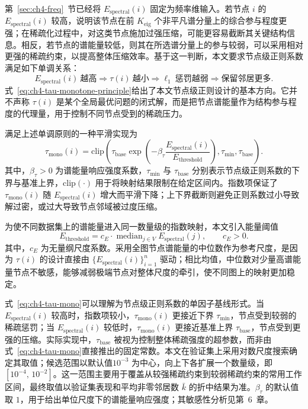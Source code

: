 第~\ref{sec:ch4-freq}~节已经将 \(E_{\text{spectral}}(i)\) 固定为频率维输入。若节点 \(i\) 的 \(E_{\text{spectral}}(i)\) 较高，说明该节点在前 \(K_{\text{eig}}\) 个非平凡谱分量上的综合参与程度更强；在稀疏化过程中，对这类节点施加过强压缩，可能更容易截断其关键结构信息。相反，若节点的谱能量较低，则其在所选谱分量上的参与较弱，可以采用相对更强的稀疏约束，以提高整体压缩效率。基于这一判断，本文要求节点级正则系数满足如下单调关系：
\begin{equation}
  E_{\text{spectral}}(i)\ \text{越高}
  \Rightarrow
  \tau(i)\ \text{越小}
  \Rightarrow
  \ell_1\ \text{惩罚越弱}
  \Rightarrow
  \text{保留邻居更多}.
  \label{eq:ch4-tau-monotone-principle}
\end{equation}
式~\eqref{eq:ch4-tau-monotone-principle}给出了本文节点级正则设计的基本方向。它并不声称 \(\tau(i)\) 是某个全局最优问题的闭式解，而是把节点谱能量作为结构参与程度的代理量，用于控制不同节点受到的稀疏压力。

满足上述单调原则的一种平滑实现为
\begin{equation}
  \tau_{\text{mono}}(i)=\mathrm{clip}\!\left(
  \tau_{\text{base}}
  \exp\!\left(
  -\beta_{\tau}\frac{E_{\text{spectral}}(i)}{E_{\text{threshold}}}
  \right),
  \tau_{\min},\tau_{\text{base}}
  \right).
  \label{eq:ch4-tau-mono}
\end{equation}
其中，\(\beta_{\tau}>0\) 为谱能量响应强度系数，\(\tau_{\min}\) 与 \(\tau_{\text{base}}\) 分别表示节点级正则系数的下界与基准上界，\(\mathrm{clip}(\cdot)\) 用于将映射结果限制在给定区间内。指数项保证了 \(\tau_{\text{mono}}(i)\) 随 \(E_{\text{spectral}}(i)\) 增大而平滑下降；上下界截断则避免正则系数过小导致解过密，或过大导致节点邻域被过度压缩。

为使不同数据集上的谱能量进入同一数量级的指数映射，本文引入能量阈值
\begin{equation}
  E_{\text{threshold}}
  =
  c_E \cdot \operatorname{median}_{j\in V} E_{\text{spectral}}(j),
  \qquad c_E>0.
  \label{eq:ch4-ethreshold}
\end{equation}
其中，\(c_E\) 为无量纲尺度系数。采用全图节点谱能量的中位数作为参考尺度，是因为 \(\tau(i)\) 的设计直接由 \(\{E_{\text{spectral}}(i)\}_{i=1}^n\) 驱动；相比均值，中位数对少量高谱能量节点不敏感，能够减弱极端节点对整体尺度的牵引，使不同图上的映射更加稳定。

式~\eqref{eq:ch4-tau-mono}可以理解为节点级正则系数的单因子基线形式。当 \(E_{\text{spectral}}(i)\) 较高时，指数项较小，\(\tau_{\text{mono}}(i)\) 更接近下界 \(\tau_{\min}\)，节点受到较弱的稀疏惩罚；当 \(E_{\text{spectral}}(i)\) 较低时，\(\tau_{\text{mono}}(i)\) 更接近基准上界 \(\tau_{\text{base}}\)，节点受到更强的压缩。实际实现中，\(\tau_{\text{base}}\) 被视为控制整体稀疏强度的超参数，而非由式~\eqref{eq:ch4-tau-mono}直接推出的固定常数。本文在验证集上采用对数尺度搜索确定其取值；候选范围以默认值\(10^{-3}\) 为中心，向上下各扩展一个数量级，即\([10^{-4},\,10^{-2}]\)。这一范围主要用于覆盖从较强稀疏约束到较弱稀疏约束的常用工作区间，最终取值以验证集表现和平均非零邻居数 \(\bar{k}\) 的折中结果为准。\(\beta_{\tau}\) 的默认值取 \(1\)，用于给出单位尺度下的谱能量响应强度；其敏感性分析见第~6~章。


